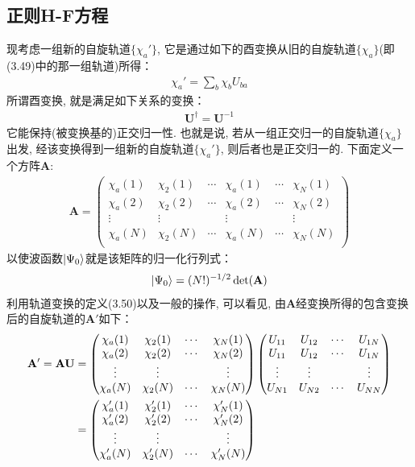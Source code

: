 \subsection{正则H-F方程}
现考虑一组新的自旋轨道$\{\chi_a'\}$, 它是通过如下的酉变换从旧的自旋轨道$\{\chi_a\}$(即(3.49)中的那一组轨道)所得：
\begin{align}
\chi_a' = \sum_b\chi_bU_{ba}
\end{align}
所谓酉变换, 就是满足如下关系的变换：
\begin{align}
\mathbf{U}^\dagger = \mathbf{U}^{-1}
\end{align}
它能保持(被变换基的)正交归一性. 也就是说, 若从一组正交归一的自旋轨道$\{\chi_a\}$出发, 经该变换得到一组新的自旋轨道$\{\chi_a'\}$, 则后者也是正交归一的. 下面定义一个方阵$\mathbf{A}$:
\begin{align}
\mathbf{A} = 
\begin{pmatrix}
\chi_a(1) & \chi_2(1) & \cdots & \chi_a(1) & \cdots & \chi_N(1) \\
\chi_a(2) & \chi_2(2) & \cdots & \chi_a(2) & \cdots & \chi_N(2) \\
\vdots    & \vdots    &        & \vdots    &        & \vdots \\
\chi_a(N) & \chi_2(N) & \cdots & \chi_a(N) & \cdots & \chi_N(N) \\
\end{pmatrix}
\end{align}
以使波函数$\Ket{\Psi_0}$就是该矩阵的归一化行列式：
\begin{align}
\Ket{\Psi_0} = (N!)^{-1/2}\det(\mathbf{A})
\end{align}
利用轨道变换的定义(3.50)以及一般的操作, 可以看见, 由$\mathbf{A}$经变换所得的包含变换后的自旋轨道的$\mathbf{A}'$如下：
\begin{align}
\mathbf{A}'  = \mathbf{AU} & = 
\begin{pmatrix}
\chi_a(1) & \chi_2(1) & \cdots & \chi_N(1) \\
\chi_a(2) & \chi_2(2) & \cdots & \chi_N(2) \\
\vdots    & \vdots    &        & \vdots \\
\chi_a(N) & \chi_2(N) & \cdots & \chi_N(N)
\end{pmatrix}
\begin{pmatrix}
U_{11} & U_{12} & \cdots & U_{1N} \\
U_{11} & U_{12} & \cdots & U_{1N} \\
\vdots & \vdots &        & \vdots \\
U_{N1} & U_{N2} & \cdots & U_{NN}
\end{pmatrix} \notag\\
& = \begin{pmatrix}
\chi_a'(1) & \chi_2'(1) & \cdots & \chi_N'(1) \\
\chi_a'(2) & \chi_2'(2) & \cdots & \chi_N'(2) \\
\vdots     & \vdots     &        & \vdots     \\
\chi_a'(N) & \chi_2'(N) & \cdots & \chi_N'(N)
\end{pmatrix}
\end{align}
